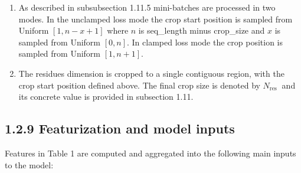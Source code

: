 \documentclass[10pt]{article}
\begin{document}
\begin{enumerate}
  \item As described in subsubsection 1.11.5 mini-batches are processed in two modes. In the unclamped loss mode the crop start position is sampled from Uniform $[1, n-x+1]$ where $n$ is seq\_length minus crop\_size and $x$ is sampled from Uniform $[0, n]$. In clamped loss mode the crop position is sampled from Uniform $[1, n+1]$.
  \item The residues dimension is cropped to a single contiguous region, with the crop start position defined above. The final crop size is denoted by $N_{\text {res }}$ and its concrete value is provided in subsection 1.11.
\end{enumerate}

\subsection*{1.2.9 Featurization and model inputs}
Features in Table 1 are computed and aggregated into the following main inputs to the model:
\end{document}
